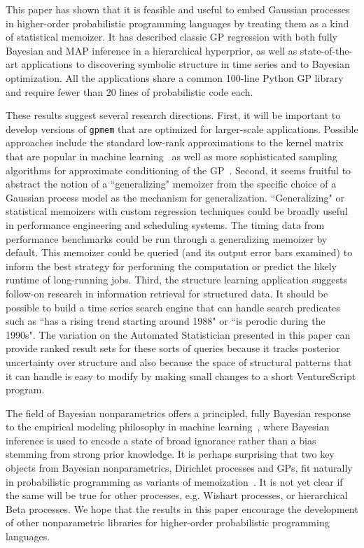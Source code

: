 This paper has shown that it is feasible and useful to embed Gaussian processes
in higher-order probabilistic programming languages by treating them as a kind
of statistical memoizer. It has described classic GP regression with both fully
Bayesian and MAP inference in a hierarchical hyperprior, as well as state-of-the-art
applications to discovering symbolic structure in time series and to Bayesian optimization.
All the applications share a common 100-line Python GP library and require fewer than 20 lines
of probabilistic code each.

These results suggest several research directions. First, it will be important
to develop versions of {\tt gpmem} that are optimized for larger-scale
applications. Possible approaches include the standard low-rank approximations
to the kernel matrix that are popular in machine learning~\citep{bui2014tree} as well
as more sophisticated sampling algorithms for approximate conditioning of the
GP~\citep{lawrence2009efficient}.
Second, it seems fruitful to abstract the notion of a ``generalizing" memoizer
from the specific choice of a Gaussian process model as the mechanism for
generalization. ``Generalizing" or statistical memoizers with custom regression techniques could be broadly useful in performance engineering and scheduling systems.
The timing data from performance benchmarks could be run through a generalizing memoizer by default.
This memoizer could be queried (and its output error bars examined) to inform the best strategy
for performing the computation or predict the likely runtime of long-running jobs.
 Third, the structure learning application suggests follow-on research in information
retrieval for structured data. It should be possible to build a time series search engine
that can handle search predicates such as ``has a rising trend starting around
1988" or ``is perodic during the 1990s".
The variation on the Automated Statistician presented in this paper can provide ranked result
sets for these sorts of queries because it tracks posterior uncertainty over structure and also
because the space of structural patterns that it can handle is easy to modify by making small
changes to a short VentureScript program.


The field of Bayesian nonparametrics offers a principled, fully Bayesian
response to the empirical modeling philosophy in machine learning~\citep{ghahramani2013bayesian},
where Bayesian inference is used to encode a state of broad ignorance rather
than a bias stemming from strong prior knowledge. It is perhaps surprising that
two key objects from Bayesian nonparametrics, Dirichlet processes and \ac{GP}s,
fit naturally in probabilistic programming as variants of
memoization~\citep{roy2008stochastic}. It is not yet clear if the same will be true
for other processes, e.g. Wishart processes, or hierarchical Beta processes. We hope that the results in this paper encourage the development of other nonparametric libraries for higher-order probabilistic programming languages.
